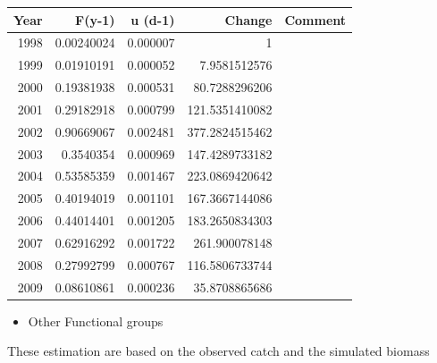 \documentclass[11pt]{article}
\begin{document}
\begin{center}
\begin{tabular}{rrrrl}
 Year  &      F(y-1)  &   u (d-1)  &          Change  &  Comment  \\
\hline
 1998  &  0.00240024  &  0.000007  &               1  &           \\
 1999  &  0.01910191  &  0.000052  &    7.9581512576  &           \\
 2000  &  0.19381938  &  0.000531  &   80.7288296206  &           \\
 2001  &  0.29182918  &  0.000799  &  121.5351410082  &           \\
 2002  &  0.90669067  &  0.002481  &  377.2824515462  &           \\
 2003  &   0.3540354  &  0.000969  &  147.4289733182  &           \\
 2004  &  0.53585359  &  0.001467  &  223.0869420642  &           \\
 2005  &  0.40194019  &  0.001101  &  167.3667144086  &           \\
 2006  &  0.44014401  &  0.001205  &  183.2650834303  &           \\
 2007  &  0.62916292  &  0.001722  &   261.900078148  &           \\
 2008  &  0.27992799  &  0.000767  &  116.5806733744  &           \\
 2009  &  0.08610861  &  0.000236  &   35.8708865686  &           \\
\end{tabular}
\end{center}


\begin{itemize}
\item Other Functional groups
\end{itemize}
These estimation are based on the observed catch and the simulated biomass
\end{document}
